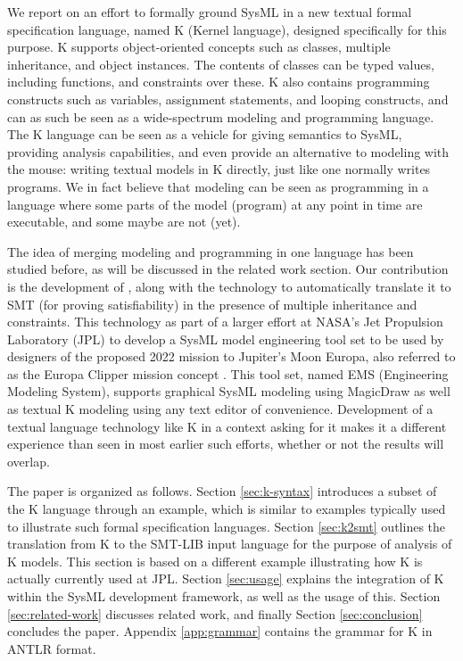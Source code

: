We report on an effort to formally ground SysML in a new textual
formal specification language, named K (Kernel language), designed
specifically for this purpose.  K supports object-oriented concepts
such as classes, multiple inheritance, and object instances. The
contents of classes can be typed values, including functions, and
constraints over these. K also contains programming constructs such as
variables, assignment statements, and looping constructs, and can as
such be seen as a wide-spectrum modeling and programming language.
The K language can be seen as a vehicle for giving semantics to SysML,
providing analysis capabilities, and even provide an alternative to
modeling with the mouse: writing textual models in K directly, just
like one normally writes programs.  We in fact believe that modeling
can be seen as programming in a language where some parts of the
model (program) at any point in time are executable, and some maybe
are not (yet).

The idea of merging modeling and programming in one language has been
studied before, as will be discussed in the related work section. Our
contribution is the development of \Klang{}, along with the technology
to automatically translate it to SMT (for proving satisfiability) in
the presence of multiple inheritance and constraints. This technology
as part of a larger effort at NASA's Jet Propulsion Laboratory (JPL)
to develop a SysML model engineering tool set to be used by designers
of the proposed 2022 mission to Jupiter's Moon Europa, also referred to
as the Europa Clipper mission concept \cite{europa-clipper}. This tool set,
named EMS (Engineering Modeling System), supports graphical SysML
modeling using MagicDraw \cite{magicdraw} as well as textual K
modeling using any text editor of convenience. Development of a
textual language technology like K in a context asking for it makes it
a different experience than seen in most earlier such efforts, whether
or not the results will overlap.

The paper is organized as follows. Section \ref{sec:k-syntax}
introduces a subset of the K language through an example, which is
similar to examples typically used to illustrate such formal
specification languages. Section \ref{sec:k2smt} outlines the
translation from K to the SMT-LIB input language for the purpose of
analysis of K models. This section is based on a different example
illustrating how K is actually currently used at JPL. Section
\ref{sec:usage} explains the integration of K within the SysML
development framework, as well as the usage of this. Section
\ref{sec:related-work} discusses related work, and finally Section
\ref{sec:conclusion} concludes the paper. Appendix \ref{app:grammar}
contains the grammar for K in ANTLR \cite{antlr} format.
